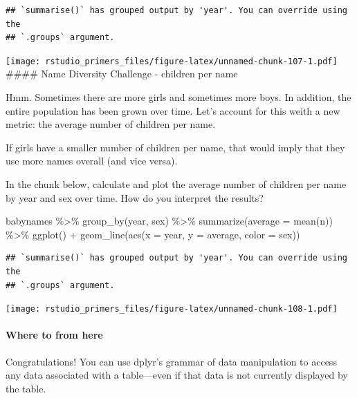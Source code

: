 \documentclass[
]{article}
\newenvironment{Shaded}{\begin{snugshade}}{\end{snugshade}}
\newcommand{\AttributeTok}[1]{\textcolor[rgb]{0.77,0.63,0.00}{#1}}
\newcommand{\FunctionTok}[1]{\textcolor[rgb]{0.00,0.00,0.00}{#1}}
\newcommand{\NormalTok}[1]{#1}
\newcommand{\SpecialCharTok}[1]{\textcolor[rgb]{0.00,0.00,0.00}{#1}}
\begin{document}
\begin{verbatim}
## `summarise()` has grouped output by 'year'. You can override using the
## `.groups` argument.
\end{verbatim}

\texttt{[image: rstudio\_primers\_files/figure-latex/unnamed-chunk-107-1.pdf]}
\#\#\#\# Name Diversity Challenge - children per name

Hmm. Sometimes there are more girls and sometimes more boys. In
addition, the entire population has been grown over time. Let's account
for this weith a new metric: the average number of children per name.

If girls have a smaller number of children per name, that would imply
that they use more names overall (and vice versa).

In the chunk below, calculate and plot the average number of children
per name by year and sex over time. How do you interpret the results?

\begin{Shaded}
\begin{Highlighting}[]
\NormalTok{babynames }\SpecialCharTok{\%\textgreater{}\%}
  \FunctionTok{group\_by}\NormalTok{(year, sex) }\SpecialCharTok{\%\textgreater{}\%}
  \FunctionTok{summarize}\NormalTok{(}\AttributeTok{average =} \FunctionTok{mean}\NormalTok{(n)) }\SpecialCharTok{\%\textgreater{}\%}
  \FunctionTok{ggplot}\NormalTok{() }\SpecialCharTok{+} 
    \FunctionTok{geom\_line}\NormalTok{(}\FunctionTok{aes}\NormalTok{(}\AttributeTok{x =}\NormalTok{ year, }\AttributeTok{y =}\NormalTok{ average, }\AttributeTok{color =}\NormalTok{ sex))}
\end{Highlighting}
\end{Shaded}

\begin{verbatim}
## `summarise()` has grouped output by 'year'. You can override using the
## `.groups` argument.
\end{verbatim}

\texttt{[image: rstudio\_primers\_files/figure-latex/unnamed-chunk-108-1.pdf]}

\hypertarget{where-to-from-here-1}{%
\paragraph{Where to from here}\label{where-to-from-here-1}}

Congratulations! You can use dplyr's grammar of data manipulation to
access any data associated with a table---even if that data is not
currently displayed by the table.
\end{document}
